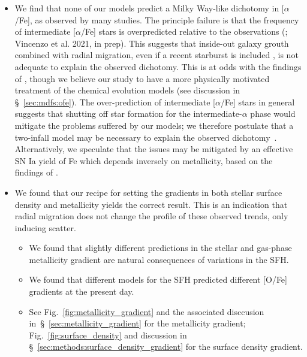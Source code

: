 \documentclass[fleqn, usenatbib]{mnras}
\begin{document}
\begin{itemize}
	\item We find that none of our models predict a Milky Way-like dichotomy 
	in [$\alpha$/Fe], as observed by many studies. The principle failure is 
	that the frequency of intermediate [$\alpha$/Fe] stars is overpredicted 
	relative to the observations (\citealp{Hayden2015}; Vincenzo et al. 2021, 
	in prep). This suggests that inside-out galaxy grouth combined with 
	radial migration, even if a recent starburst is included 
	\citep[e.g.][]{Mor2019, Isern2019}, is not adequate to explain the 
	observed dichotomy. This is at odds with the findings of 
	\citet{Sharma2020}, though we believe our study to have a more physically 
	motivated treatment of the chemical evolution models (see discussion in 
	\S~\ref{sec:mdfs:ofe}). The over-prediction of intermediate [$\alpha$/Fe] 
	stars in general suggests that shutting off star formation for the 
	intermediate-$\alpha$ phase would mitigate the problems suffered by our 
	models; we therefore postulate that a two-infall model may be necessary 
	to explain the observed dichotomy~\citep[e.g.][]{Chiappini1997, 
	Chiappini2001, Romano2010, Grisoni2017, Noguchi2018, Spitoni2016, 
	Spitoni2018, Spitoni2019, Spitoni2020}. Alternatively, we 
	speculate that the issues may be mitigated by an effective SN Ia yield of 
	Fe which depends inversely on metallicity, based on the findings of 
	\citet{Brown2019}. 

	\item We found that our recipe for setting the gradients in both stellar 
	surface density and metallicity yields the correct result. This is an 
	indication that radial migration does not change the profile of these 
	observed trends, only inducing scatter. 
	\begin{itemize} 
		\item We found that slightly different predictions in the stellar 
		and gas-phase metallicity gradient are natural consequences of 
		variations in the SFH. 

		\item We found that different models for the SFH predicted different 
		[O/Fe] gradients at the present day. 

		\item See Fig.~\ref{fig:metallicity_gradient} and the associated 
		disccusion in~\S~\ref{sec:metallicity_gradient} for the metallicity 
		gradient; Fig.~\ref{fig:surface_density} and discussion in 
		\S~\ref{sec:methods:surface_density_gradient} for the surface 
		density gradient. 
	\end{itemize} 


\end{itemize}
\end{document}
